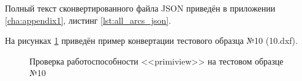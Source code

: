 Полный текст сконвертированного файла JSON приведён в приложении \ref{cha:appendix1}, листинг \ref{lst:all_arcs_json}.

На рисунках \ref{fig:tests} приведён пример конвертации тестового образца №10 (10.dxf).

\begin{figure}[H]
	\centering
	\begin{minipage}[h]{0.3\linewidth}
	\end{minipage}
	\begin{minipage}[h]{0.6\linewidth}
	\end{minipage}
	\begin{minipage}[h]{0.4\linewidth}
	\end{minipage}
	\begin{minipage}[h]{0.4\linewidth}
	\end{minipage}
	\begin{minipage}[h]{0.4\linewidth}
	\end{minipage}
	\begin{minipage}[h]{0.4\linewidth}
	\end{minipage}
	\caption{Проверка работоспособности <<primiview>> на тестовом образце №10}
	\label{fig:tests}
\end{figure}

